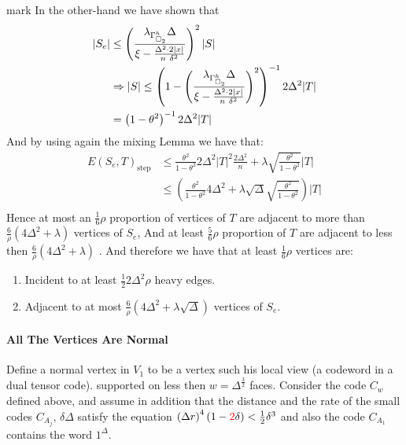 \documentclass{article}
\begin{document}
\begin{multicols*}{2}
    \color{red} mark \color{black} In the other-hand we have shown that 
 \begin{equation*}
   \begin{split}
     |S_{e}| &  \le \left( \frac{ \lambda_{\Gamma_{\square_{2}}^{h}}\Delta}{\xi - \frac{\Delta^{2}\cdot 2|x|}{n\ \delta^{2}} } \right)^{2} |S| \\ &
     \Rightarrow |S| \le \left( 1 - \left( \frac{ \lambda_{\Gamma_{\square_{2}}^{h}}\Delta}{\xi - \frac{\Delta^{2}\cdot 2|x|}{n\ \delta^{2}} } \right)^{2}\right)^{-1}2\Delta^{2}|T| \\
     & = \left( 1 - \theta^2 \right)^{-1} 2 \Delta^{2} |T|
   \end{split}
 \end{equation*}
 And by using again the mixing Lemma we have that: 
 \begin{equation*}
   \begin{split}
     E\left( S_{e},T \right)_{\text{step}} &\le \frac{\theta^2}{1- \theta^2}2\Delta^{2}|T|^2 \frac{2\Delta^{2}}{n} + \lambda\sqrt{\frac{\theta^2}{1- \theta^2}}|T| \\ 
     & \le  \left( \frac{\theta^2}{1- \theta^2}4\Delta^{2} + \lambda\sqrt{\Delta}\sqrt{\frac{\theta^2}{1- \theta^2}}\right)|T| \\ 
  \end{split}
 \end{equation*}
 Hence at most an $\frac{1}{6}\rho $ proportion of vertices of $T$ are adjacent to more than $\frac{6}{\rho} \left( 4\Delta^{2} + \lambda  \right) $ vertices of $S_{e}$, And at least $\frac{5}{6}\rho$ proportion of $T$ are adjacent to less then $\frac{6}{\rho} \left( 4\Delta^{2} + \lambda  \right) $ . 
 And therefore we have that at least $\frac{1}{6}\rho$ vertices are:
 \begin{enumerate}
   \item Incident to at least $\frac{1}{2}2\Delta^{2}\rho$ heavy edges. 
   \item Adjacent to at most $ \frac{6}{\rho} \left( 4\Delta^{2} + \lambda \sqrt{\Delta}  \right)$ vertices of $S_{e}$.  
 \end{enumerate}
	\paragraph{All The Vertices Are Normal} Define a normal vertex in $ V_{1} $ to be a vertex such his local view (a codeword in a dual tensor code). 
	supported on less then $w = \Delta^\frac{3}{2}$ faces.
	Consider the code $C_{w}$ defined above, and assume in addition that the distance and the rate of 
	the small codes $C_{A_{j}}$, $\delta \Delta$ satisfy the equation $ \left(\Delta r\right)^{4}\left(1 - \color{red}2\color{black}\delta\right) < \frac{1}{2}\delta^{3} $ and also the code $ C_{A_{1}}  $ 
      contains the word $ 1^{\Delta} $.



\end{multicols*}
\end{document}
